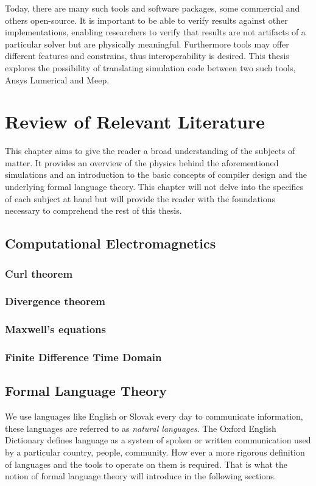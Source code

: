Today, there are many such tools and software packages, some commercial and others open-source. It is important to be able to verify results against other implementations, enabling researchers to verify that results are not artifacts of a particular solver but are physically meaningful. Furthermore tools may offer different features and constrains, thus interoperability is desired. This thesis explores the possibility of translating simulation code between two such tools, Ansys Lumerical and Meep.



\chapter{Review of Relevant Literature}
This chapter aims to give the reader a broad understanding of the subjects of matter. It provides an overview of the physics behind the aforementioned simulations and an introduction to the basic concepts of compiler design and the underlying formal language theory. This chapter will not delve into the specifics of each subject at hand but will provide the reader with the foundations necessary to comprehend the rest of this thesis.

\section{Computational Electromagnetics}
\subsection*{Curl theorem}
\subsection*{Divergence theorem}
\subsection*{Maxwell's equations}



\subsection*{Finite Difference Time Domain}
\section{Formal Language Theory}
We use languages like English or Slovak every day to communicate information, these languages are referred to as \emph{natural languages}. The Oxford English Dictionary defines language as a system of spoken or written communication used by a particular country, people, community. How ever a more rigorous definition of languages and the tools to operate on them is required. That is what the notion of formal language theory will introduce in the following sections.

